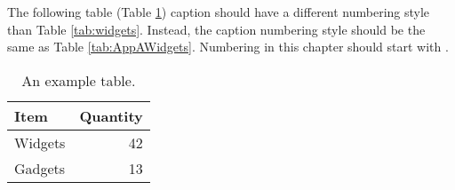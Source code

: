 The following table (Table \ref{tab:AppBWidgets}) caption should have a different numbering style than Table \ref{tab:widgets}. Instead, the caption numbering style should be the same as Table \ref{tab:AppAWidgets}. Numbering in this chapter should start with \thesection.

\begin{table}[!h]
\centering
\caption[An example table in Appendix B]{An example table.}\label{tab:AppBWidgets}
\begin{tabular}{lr}
Item & Quantity \\
\hline
Widgets & 42 \\
Gadgets & 13
\end{tabular}
\end{table}
